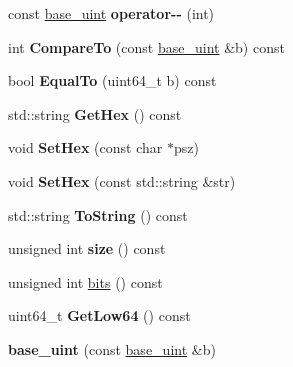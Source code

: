 \begin{DoxyCompactItemize}
\mbox{\label{classbase__uint_a78a8e46c434c0e61be86282fe9543587}} 
const \mbox{\hyperlink{classbase__uint}{base\+\_\+uint}} {\bfseries operator-\/-\/} (int)
\item 
\mbox{\label{classbase__uint_a1196e0ff823836958e45aec3a246b9d2}} 
int {\bfseries Compare\+To} (const \mbox{\hyperlink{classbase__uint}{base\+\_\+uint}} \&b) const
\item 
\mbox{\label{classbase__uint_aaba2c27863f6d5077ed21cd353766168}} 
bool {\bfseries Equal\+To} (uint64\+\_\+t b) const
\item 
\mbox{\label{classbase__uint_ae5e7b7481de91ebead20eebd5d685441}} 
std\+::string {\bfseries Get\+Hex} () const
\item 
\mbox{\label{classbase__uint_ade1a897fac931f28f54998c92c797228}} 
void {\bfseries Set\+Hex} (const char $\ast$psz)
\item 
\mbox{\label{classbase__uint_afe3600e6ae4e9f69e1c036581a2716c8}} 
void {\bfseries Set\+Hex} (const std\+::string \&str)
\item 
\mbox{\label{classbase__uint_acccba4d9d51a0c36261718ca0cbb293b}} 
std\+::string {\bfseries To\+String} () const
\item 
\mbox{\label{classbase__uint_a1f49b034e686269601ea89b0319b8004}} 
unsigned int {\bfseries size} () const
\item 
unsigned int \mbox{\hyperlink{classbase__uint_afe1eacc0b592cf184ac8ee0446997fbe}{bits}} () const
\item 
\mbox{\label{classbase__uint_ad8dbf3216dd15a64f1598344ad7a71ea}} 
uint64\+\_\+t {\bfseries Get\+Low64} () const
\item 
\mbox{\label{classbase__uint_a5d4e4c28c82c3a12b3689860081579c1}} 
{\bfseries base\+\_\+uint} (const \mbox{\hyperlink{classbase__uint}{base\+\_\+uint}} \&b)
\item 
\mbox{\label{classbase__uint_a5b67cea01e9219160fe251053adc7cc7}} 

\end{DoxyCompactItemize}
